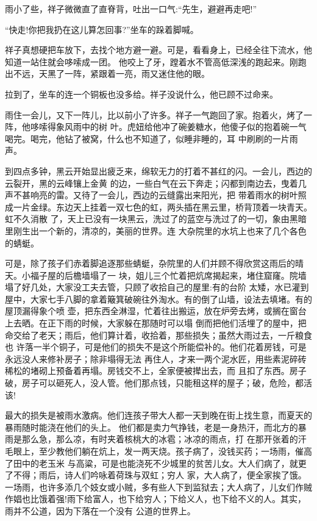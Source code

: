 \documentclass[11pt,a4paper,onecolumn]{article}
\begin{document}
雨小了些，祥子微微直了直脊背，吐出一口气:``先生，避避再走吧!''

``快走!你把我扔在这儿算怎回事?''坐车的跺着脚喊。

祥子真想硬把车放下，去找个地方避一避。可是，看看身上，已经全往下流水，他知道一站住就会哆嗦成一团。
他咬上了牙，蹚着水不管高低深浅的跑起来。刚跑出不远，天黑了一阵，紧跟着一亮，雨又迷住他的眼。

拉到了，坐车的连一个铜板也没多给。祥子没说什么，他已顾不过命来。

雨住一会儿，又下一阵儿，比以前小了许多。祥子一气跑回了家。抱着火，烤了一阵，他哆嗦得象风雨中的树
叶。虎妞给他冲了碗姜糖水，他傻子似的抱着碗一气喝完。喝完，他钻了被窝，什么也不知道了，似睡非睡的，耳
中刷刷的一片雨声。

到四点多钟，黑云开始显出疲乏来，绵软无力的打着不甚红的闪。一会儿，西边的云裂开，黑的云峰镶上金黄
的边，一些白气在云下奔走；闪都到南边去，曳着几声不甚响亮的雷。又待了一会儿，西边的云缝露出来阳光，把
带着雨水的树叶照成一片金绿。东边天上挂着一双七色的虹，两头插在黑云里，桥背顶着一块青天。虹不久消散
了，天上已没有一块黑云，洗过了的蓝空与洗过了的一切，象由黑暗里刚生出一个新的，清凉的，美丽的世界。连
大杂院里的水坑上也来了几个各色的蜻蜓。

可是，除了孩子们赤着脚追逐那些蜻蜓，杂院里的人们并顾不得欣赏这雨后的晴天。小福子屋的后檐墙塌了一
块，姐儿三个忙着把炕席揭起来，堵住窟窿。院墙塌了好几处，大家没工夫去管，只顾了收拾自己的屋里:有的台阶
太矮，水已灌到屋中，大家七手八脚的拿着簸箕破碗往外淘水。有的倒了山墙，设法去填堵。有的屋顶漏得象个喷
壶，把东西全淋湿，忙着往出搬运，放在炉旁去烤，或搁在窗台上去晒。在正下雨的时候，大家躲在那随时可以塌
倒而把他们活埋了的屋中，把命交给了老天；雨后，他们算计着，收拾着，那些损失；虽然大雨过去，一斤粮食也
许落一半个铜子，可是他们的损失不是这个所能偿补的。他们花着房钱，可是永远没人来修补房子；除非塌得无法
再住人，才来一两个泥水匠，用些素泥碎砖稀松的堵砌上\myrule 预备着再塌。房钱交不上，全家便被撵出去，而
且扣了东西。房子破，房子可以砸死人，没人管。他们那点钱，只能租这样的屋子；破，危险，都活该!

最大的损失是被雨水激病。他们连孩子带大人都一天到晚在街上找生意，而夏天的暴雨随时能浇在他们的头上。
他们都是卖力气挣钱，老是一身热汗，而北方的暴雨是那么急，那么凉，有时夹着核桃大的冰雹；冰凉的雨点，打
在那开张着的汗毛眼上，至少教他们躺在炕上，发一两天烧。孩子病了，没钱买药；一场雨，催高了田中的老玉米
与高粱，可是也能浇死不少城里的贫苦儿女。大人们病了，就更了不得；雨后，诗人们吟咏着荷珠与双虹；穷人
家，大人病了，便全家挨了饿。一场雨，也许多添几个妓女或小贼，多有些人下到监狱去；大人病了，儿女们作贼
作娼也比饿着强!雨下给富人，也下给穷人；下给义人，也下给不义的人。其实，雨并不公道，因为下落在一个没有
公道的世界上。
\end{document}
